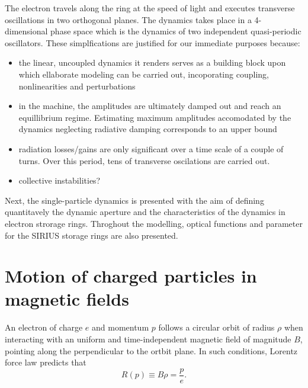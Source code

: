 The electron travels along the ring at the speed of light and executes transverse oscillations in two orthogonal planes. The dynamics takes place in a 4-dimensional phase space which is the  dynamics of two independent quasi-periodic oscillators. These simplfications are justified for our immediate purposes because:
\begin{itemize}
    \item the linear, uncoupled dynamics it renders serves as a building block upon which ellaborate modeling can be carried out, incoporating coupling, nonlinearities and perturbations
    \item in the machine, the amplitudes are ultimately damped out and reach an equillibrium regime. Estimating maximum amplitudes accomodated by the dynamics neglecting radiative damping corresponds to an upper bound
    \item radiation losses/gains are only significant over a time scale of a couple of turns. Over this period, tens of transverse oscilations are carried out.
    \item collective instabilities?
\end{itemize}

Next, the single-particle dynamics is presented with the aim of defining quantitavely the dynamic aperture and the characteristics of the dynamics in electron strorage rings. Throghout the modelling, optical functions and parameter for the SIRIUS storage rings are also presented.
\section{Motion of charged particles in magnetic fields}
An electron of charge $e$ and momentum $p$ follows a circular orbit of radius $\rho$ when interacting with an uniform and time-independent magnetic field of magnitude $B$, pointing along the perpendicular to the ortbit plane. In such conditions, Lorentz force law predicts that
\begin{equation}
    R(p)\equiv B\rho = \frac{p}{e}.
    \label{eq:rigidity}
\end{equation}

